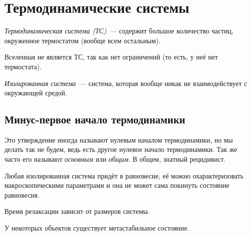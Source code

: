 \documentclass[../main.tex]{subfiles}
\begin{document}
    \section{Термодинамические системы}
    \begin{definition}
        \emph{Термодинамическая система (ТС)}~--- содержит большое количество частиц, окруженное термостатом (вообще всем остальным). 
    \end{definition}
    \begin{note}
        Вселенная не является ТС, так как нет ограничений (то есть, у неё нет термостата).
    \end{note}
    
    \begin{definition}
        \emph{Изолированная система}~--- система, которая вообще никак не взаимодействует с окружающей средой.
    \end{definition}
    
    \subsection{Минус-первое начало термодинамики}
    Это утверждение иногда называют нулевым началом термодинамики, но мы делать так не будем, ведь есть другое нулевое начало термодинамики. Так же часто его называют \emph{основным} или \emph{общим}. В общем, знатный рецидивист.

    \begin{proposition}
        Любая изолированная система придёт в равновесие, её можно охарактеризовать макроскопическими параметрами и она не может сама покинуть состояние равновесия.
    \end{proposition}
        
    \begin{note}
        Время релаксации зависит от размеров системы.
    \end{note}
    \begin{note}
        У некоторых объектов существует метастабильное состояние.
    \end{note}
\end{document}
